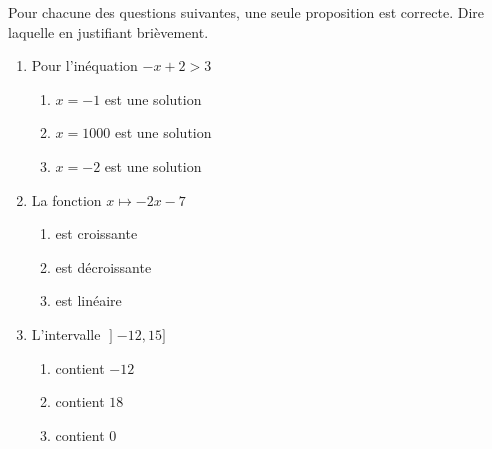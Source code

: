 
\begin{exercice}\label{exosmath-0519}

    Pour chacune des questions suivantes, une seule proposition est correcte. Dire laquelle en justifiant brièvement.

    \begin{enumerate}
        \item
        Pour l'inéquation \( -x+2>3\)
        \begin{enumerate}
            \item
                
        \( x=-1\) est une solution\item\( x=1000\) est une solution\item\( x=-2\) est une solution \\
        \end{enumerate}
    \item 
        La fonction \( x\mapsto -2x-7\)
        \begin{enumerate}
                
            \item est croissante\item est décroissante\item est linéaire\\
        \end{enumerate}
    \item
        L'intervalle \( \mathopen] -12 , 15 \mathclose]\)
        \begin{enumerate}
                
    \item contient \( -12\)\item contient \( 18\)\item contient \( 0\)\\
        \end{enumerate}
            
    \end{enumerate}

\end{exercice}
